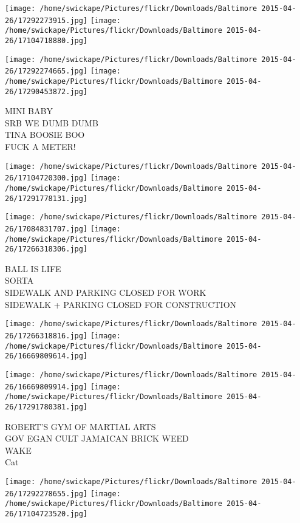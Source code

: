 \documentclass[10pt,letterpaper]{article}
\begin{document}
\texttt{[image: /home/swickape/Pictures/flickr/Downloads/Baltimore 2015-04-26/17292273915.jpg]}
\texttt{[image: /home/swickape/Pictures/flickr/Downloads/Baltimore 2015-04-26/17104718880.jpg]}

\texttt{[image: /home/swickape/Pictures/flickr/Downloads/Baltimore 2015-04-26/17292274665.jpg]}
\texttt{[image: /home/swickape/Pictures/flickr/Downloads/Baltimore 2015-04-26/17290453872.jpg]}

MINI BABY\\
SRB WE DUMB DUMB\\
TINA BOOSIE BOO\\
FUCK A METER!\\
\pagebreak

\texttt{[image: /home/swickape/Pictures/flickr/Downloads/Baltimore 2015-04-26/17104720300.jpg]}
\texttt{[image: /home/swickape/Pictures/flickr/Downloads/Baltimore 2015-04-26/17291778131.jpg]}

\texttt{[image: /home/swickape/Pictures/flickr/Downloads/Baltimore 2015-04-26/17084831707.jpg]}
\texttt{[image: /home/swickape/Pictures/flickr/Downloads/Baltimore 2015-04-26/17266318306.jpg]}

BALL IS LIFE\\
SORTA\\
SIDEWALK AND PARKING CLOSED FOR WORK\\
SIDEWALK + PARKING CLOSED FOR CONSTRUCTION\\
\pagebreak

\texttt{[image: /home/swickape/Pictures/flickr/Downloads/Baltimore 2015-04-26/17266318816.jpg]}
\texttt{[image: /home/swickape/Pictures/flickr/Downloads/Baltimore 2015-04-26/16669809614.jpg]}

\texttt{[image: /home/swickape/Pictures/flickr/Downloads/Baltimore 2015-04-26/16669809914.jpg]}
\texttt{[image: /home/swickape/Pictures/flickr/Downloads/Baltimore 2015-04-26/17291780381.jpg]}

ROBERT'S GYM OF MARTIAL ARTS\\
GOV EGAN CULT JAMAICAN BRICK WEED\\
WAKE\\
Cat\\
\pagebreak

\texttt{[image: /home/swickape/Pictures/flickr/Downloads/Baltimore 2015-04-26/17292278655.jpg]}
\texttt{[image: /home/swickape/Pictures/flickr/Downloads/Baltimore 2015-04-26/17104723520.jpg]}
\end{document}
